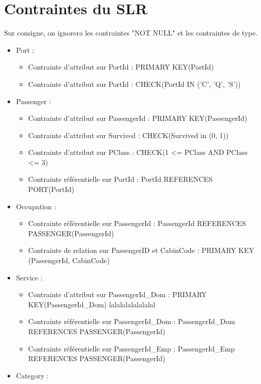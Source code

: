 \documentclass[12pt, a4paper, french]{article}
\begin{document}
\begin{sloppypar}
\begin{itemize}
\end{itemize}
\newpage
\section{Contraintes du SLR}

Sur consigne, on ignorera les contraintes "NOT NULL" et les contraintes de type.

\begin{itemize}

\item  Port :
\begin{itemize}
\item Contrainte d'attribut sur PortId : PRIMARY KEY(PortId)
\item Contrainte d'attribut sur PortId : CHECK(PortId IN ('C', 'Q', 'S'))
\end{itemize}
\item Passenger :
\begin{itemize} 
\item Contrainte d'attribut sur PassengerId : PRIMARY KEY(PassengerId)
\item Contrainte d'attribut sur Survived : CHECK(Survived in (0, 1))
\item Contrainte d'attribut sur PClass : CHECK(1 <= PClass AND PClass <= 3)
\item Contrainte référentielle sur PortId : PortId REFERENCES PORT(PortId)
\end{itemize}
\item Occupation :
\begin{itemize}
\item Contrainte référentielle sur PassengerId : PassengerId REFERENCES PASSENGER(PassengerId)
\item Contrainte de relation sur PassengerID et CabinCode : PRIMARY KEY (PassengerId, CabinCode)
\end{itemize}
\item Service :
\begin{itemize}
\item Contrainte d'attribut sur PassengerId\_Dom : PRIMARY KEY(PassengerId\_Dom) lalalalalalalalal
\item Contrainte référentielle sur PassengerId\_Dom : PassengerId\_Dom REFERENCES PASSENGER(PassengerId)
\item Contrainte référentielle sur PassengerId\_Emp : PassengerId\_Emp REFERENCES PASSENGER(PassengerId)
\end{itemize}
\item Category :

\end{itemize}
\end{sloppypar}
\end{document}
